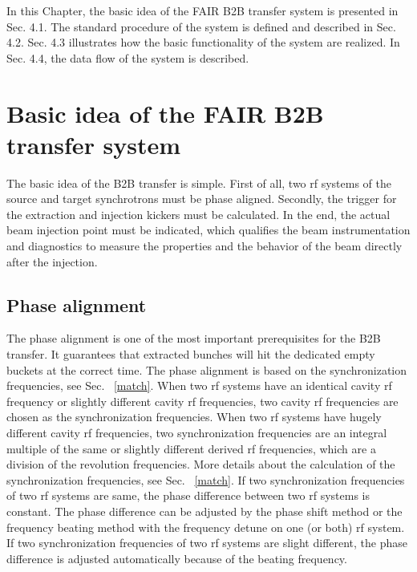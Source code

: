 

In this Chapter, the basic idea of the FAIR B2B transfer system is presented in Sec. 4.1. The standard procedure of the system is defined and described in Sec. 4.2. Sec. 4.3 illustrates how the basic functionality of the system are realized. In Sec. 4.4, the data flow of the system is described. 

\section{Basic idea of the FAIR B2B transfer system} 
The basic idea of the B2B transfer is simple. First of all, two rf systems of the source and target synchrotrons must be phase aligned. Secondly, the trigger for the extraction and injection kickers must be calculated. In the end, the actual beam injection point must be indicated, which
qualifies the beam instrumentation and diagnostics to measure the properties and the behavior of the beam directly after the injection. 

\subsection{Phase alignment}
The phase alignment is one of the most important prerequisites for the B2B transfer. It guarantees that extracted bunches will hit the dedicated empty buckets at the correct time. The phase alignment is based on the synchronization frequencies, see Sec. ~\ref{match}. When two rf systems have an identical cavity rf frequency or slightly different cavity rf frequencies, two cavity rf frequencies are chosen as the synchronization frequencies. When two rf systems have hugely different cavity rf frequencies, two synchronization frequencies are an integral multiple of the same or slightly different derived rf frequencies, which are a division of the revolution frequencies. More details about the calculation of the synchronization frequencies, see Sec. ~\ref{match}. If two synchronization frequencies of two rf systems are same, the phase difference between two rf systems is constant. The phase difference can be adjusted by the phase shift method or the frequency beating method with the frequency detune on one (or both) rf system. If two synchronization frequencies of two rf systems are slight different, the phase difference is adjusted automatically because of the beating frequency. %

